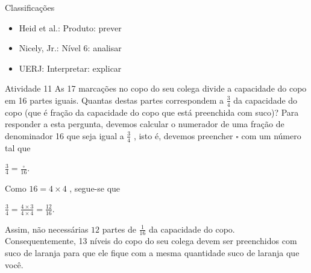 \begin{multicols}{2}
Classificações
\begin{itemize} %
  \item     Heid et al.: Produto: prever
  \item     Nicely, Jr.: Nível 6: analisar
  \item     UERJ: Interpretar: explicar
\end{itemize} %

\begin{resposta*}{Atividade 11}  
  As 17 marcações no copo do seu colega divide a capacidade do copo em 16 partes 
iguais. Quantas destas partes correspondem a   $\frac{3}{4}$   da capacidade do 
copo (que é fração da capacidade do copo que está preenchida com suco)? Para 
responder a esta pergunta, devemos calcular o numerador de uma fração de 
denominador 16 que seja igual a   $\frac{3}{4}$  , isto é, devemos preencher   
$\square$   com um número tal que  
  
  $\frac{3}{4} = \frac{\square}{16}$.  
  
  Como   $16 = 4 \times 4$  , segue-se que  
  
  $\frac{3}{4} = \frac{4 \times 3}{4 \times 4} = \frac{12}{16}$.   
  
  Assim, não necessárias   $12$   partes de   $\frac{1}{16}$   da capacidade do 
copo. Consequentemente,  
  13 níveis do copo do seu colega devem ser preenchidos com suco de laranja para 
que ele fique com a mesma quantidade suco de laranja que você.  
  

\begin{center}
\end{center}


\end{resposta*}
\end{multicols}
